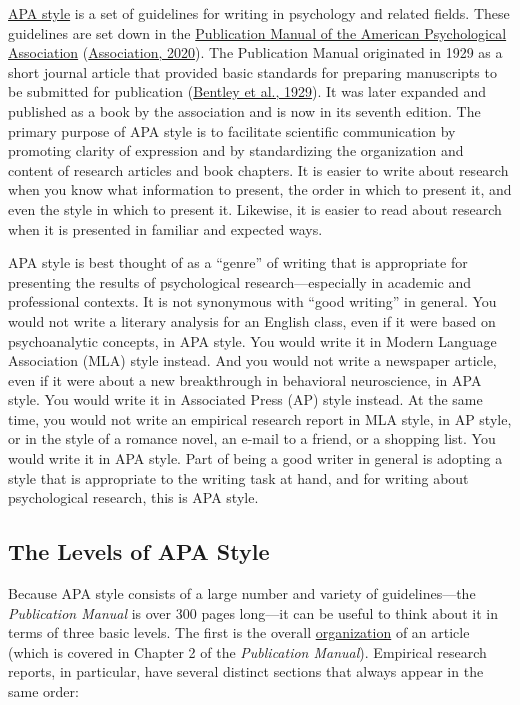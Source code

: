 \documentclass[
]{krantz}
\begin{document}
\protect\hyperlink{apa-style}{APA style} is a set of guidelines for writing in psychology and related fields. These guidelines are set down in the \protect\hyperlink{publication-manual-of-the-american-psychological-association}{Publication Manual of the American Psychological Association} (\protect\hyperlink{ref-american2020publication}{Association, 2020}). The Publication Manual originated in 1929 as a short journal article that provided basic standards for preparing manuscripts to be submitted for publication (\protect\hyperlink{ref-bentley1929instructions}{Bentley et al., 1929}). It was later expanded and published as a book by the association and is now in its seventh edition. The primary purpose of APA style is to facilitate scientific communication by promoting clarity of expression and by standardizing the organization and content of research articles and book chapters. It is easier to write about research when you know what information to present, the order in which to present it, and even the style in which to present it. Likewise, it is easier to read about research when it is presented in familiar and expected ways.

APA style is best thought of as a ``genre'' of writing that is appropriate for presenting the results of psychological research---especially in academic and professional contexts. It is not synonymous with ``good writing'' in general. You would not write a literary analysis for an English class, even if it were based on psychoanalytic concepts, in APA style. You would write it in Modern Language Association (MLA) style instead. And you would not write a newspaper article, even if it were about a new breakthrough in behavioral neuroscience, in APA style. You would write it in Associated Press (AP) style instead. At the same time, you would not write an empirical research report in MLA style, in AP style, or in the style of a romance novel, an e-mail to a friend, or a shopping list. You would write it in APA style. Part of being a good writer in general is adopting a style that is appropriate to the writing task at hand, and for writing about psychological research, this is APA style.

\hypertarget{the-levels-of-apa-style}{%
\subsection*{The Levels of APA Style}\label{the-levels-of-apa-style}}


Because APA style consists of a large number and variety of guidelines---the \emph{Publication Manual} is over 300 pages long---it can be useful to think about it in terms of three basic levels. The first is the overall \protect\hyperlink{organization-1}{organization} of an article (which is covered in Chapter 2 of the \emph{Publication Manual}). Empirical research reports, in particular, have several distinct sections that always appear in the same order:
\end{document}
